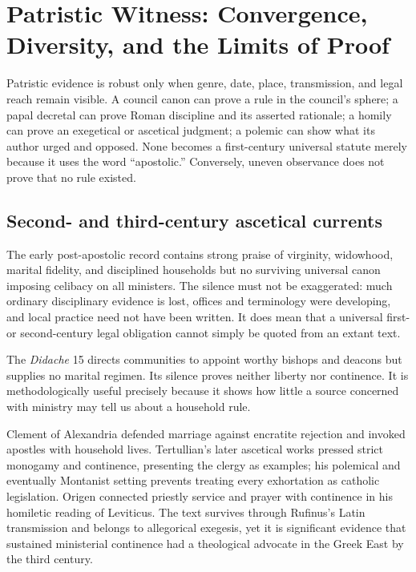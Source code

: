 \section{Patristic Witness: Convergence, Diversity, and the Limits of Proof}

Patristic evidence is robust only when genre, date, place, transmission, and legal reach remain visible. A council canon can prove a rule in the council's sphere; a papal decretal can prove Roman discipline and its asserted rationale; a homily can prove an exegetical or ascetical judgment; a polemic can show what its author urged and opposed. None becomes a first-century universal statute merely because it uses the word ``apostolic.'' Conversely, uneven observance does not prove that no rule existed.

\subsection{Second- and third-century ascetical currents}

The early post-apostolic record contains strong praise of virginity, widowhood, marital fidelity, and disciplined households but no surviving universal canon imposing celibacy on all ministers. The silence must not be exaggerated: much ordinary disciplinary evidence is lost, offices and terminology were developing, and local practice need not have been written. It does mean that a universal first- or second-century legal obligation cannot simply be quoted from an extant text.

The \emph{Didache} 15 directs communities to appoint worthy bishops and deacons but supplies no marital regimen. Its silence proves neither liberty nor continence. It is methodologically useful precisely because it shows how little a source concerned with ministry may tell us about a household rule.

Clement of Alexandria defended marriage against encratite rejection and invoked apostles with household lives. Tertullian's later ascetical works pressed strict monogamy and continence, presenting the clergy as examples; his polemical and eventually Montanist setting prevents treating every exhortation as catholic legislation. Origen connected priestly service and prayer with continence in his homiletic reading of Leviticus. The text survives through Rufinus's Latin transmission and belongs to allegorical exegesis, yet it is significant evidence that sustained ministerial continence had a theological advocate in the Greek East by the third century.

